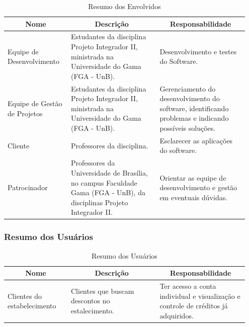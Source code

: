 \begin{apendicesenv}
\begin{table}[htp]
    \centering
    \caption{Resumo dos Envolvidos}
    \label{my-label}
    \begin{tabular}{|p{0.25\linewidth}|p{0.35\linewidth}|p{0.35\linewidth}|}
        \hline
        \multicolumn{1}{|c|}{\textbf{Nome}} & \multicolumn{1}{c|}{\textbf{Descrição}} & \multicolumn{1}{c|}{\textbf{Responsabilidade}} \\ \hline
        Equipe de  Desenvolvimento          &        Estudantes da disciplina Projeto Integrador II, ministrada na Universidade do Gama (FGA - UnB).                                 &               Desenvolvimento e testes do Software.                                 \\ \hline
        Equipe de Gestão de Projetos                                    &     Estudantes da disciplina Projeto Integrador II, ministrada na Universidade do Gama (FGA - UnB).                                    &           Gerenciamento do desenvolvimento do software, identificando problemas e indicando possíveis soluções.                                     \\ \hline
        Cliente                                   &             Professores da disciplina.                            &         Esclarecer as aplicações do software.                                       \\ \hline
        Patrocinador                                    &         Professores da Universidade de Brasília, no campus Faculdade Gama (FGA - UnB), da disciplinas Projeto Integrador II.                                &       Orientar as equipe de desenvolvimento e gestão em eventuais dúvidas.                                         \\ \hline
    \end{tabular}
\end{table}

\subsubsection{Resumo dos Usuários}

\begin{table}[htp]
    \centering
    \caption{Resumo dos Usuários}
    \label{my-label}
    \begin{tabular}{|p{0.25\linewidth}|p{0.35\linewidth}|p{0.35\linewidth}|}
        \hline
        \multicolumn{1}{|c|}{\textbf{Nome}} & \multicolumn{1}{c|}{\textbf{Descrição}} & \multicolumn{1}{c|}{\textbf{Responsabilidade}} \\ \hline
        Clientes do estabelecimento & Clientes que buscam descontos no estalecimento. & Ter acesso a conta individual e visualização e controle de créditos já adquiridos. \\ \hline
    \end{tabular}
\end{table}


\end{apendicesenv}

